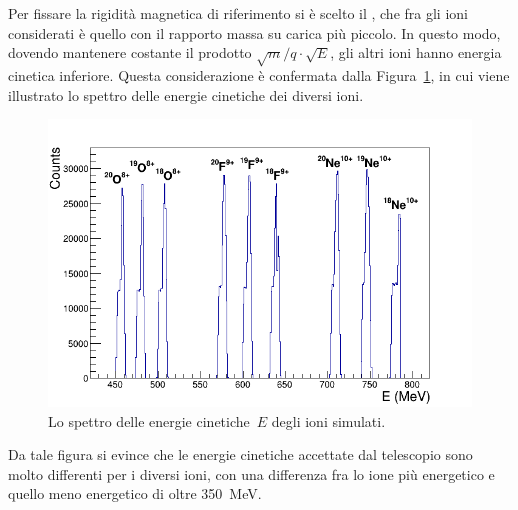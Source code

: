 Per fissare la rigidità magnetica di riferimento si è scelto il , che fra gli ioni considerati è quello con il rapporto massa su carica più piccolo.
In questo modo, dovendo mantenere costante il prodotto $\sqrt{m}/q \cdot \sqrt{E}$, gli altri ioni hanno energia cinetica inferiore.
Questa considerazione è confermata dalla Figura~\ref{fig:KinEa}, in cui viene illustrato lo spettro delle energie cinetiche dei diversi ioni.
\begin{figure} [!p]
	\centering
	\includegraphics[width=\textwidth, keepaspectratio]{Grafici_Tesi2/PID/KinE2.png}
	
	\caption{Lo spettro delle energie cinetiche~$E$ degli ioni simulati.} \label{fig:KinEa}
\end{figure}
Da tale figura si evince che le energie cinetiche accettate dal telescopio sono molto differenti per i diversi ioni, con una differenza fra lo ione più energetico e quello meno energetico di oltre 350~MeV.






